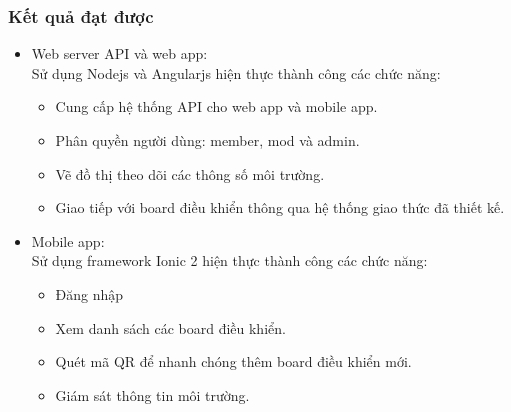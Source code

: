 \documentclass[a4paper,12pt,oneside]{article}
\begin{document}
	\subsubsection{Kết quả đạt được}
	\begin{itemize}
	\item Web server API và web app: \\
	Sử dụng Nodejs và Angularjs hiện thực thành công các chức năng: 
		\begin{itemize}
			\item Cung cấp hệ thống API cho web app và mobile app. 

			\item Phân quyền người dùng: member, mod và admin. 

			\item Vẽ đồ thị theo dõi các thông số môi trường. 

			\item Giao tiếp với board điều khiển thông qua hệ thống giao thức đã thiết kế. 
		\end{itemize}

	\item Mobile app: \\
	Sử dụng framework Ionic 2 hiện thực thành công các chức năng: 
		\begin{itemize}
			\item Đăng nhập 

			\item Xem danh sách các board điều khiển. 

			\item Quét mã QR để nhanh chóng thêm board điều khiển mới. 

			\item Giám sát thông tin môi trường. 


\end{itemize}
\end{itemize}
\end{document}
